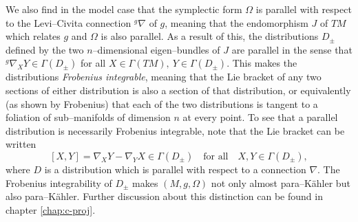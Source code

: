 We also find in the model case that the symplectic form $\Omega$ is parallel with respect to the Levi--Civita connection $^g\nabla$ of $g$, meaning that the endomorphism $J$ of $TM$ which relates $g$ and $\Omega$ is also parallel.  As a result of this, the distributions $D_\pm$ defined by the two $n$--dimensional eigen--bundles of $J$ are parallel in the sense that $^g\nabla_XY\in\Gamma(D_\pm)$ for all $X\in \Gamma(TM),\ Y\in\Gamma(D_\pm)$. This makes the distributions \textit{Frobenius integrable}, meaning that the Lie bracket of any two sections of either distribution is also a section of that distribution, or equivalently (as shown by Frobenius) that each of the two distributions is tangent to a foliation of sub--manifolds of dimension $n$ at every point. To see that a parallel distribution is necessarily Frobenius integrable, note that the Lie bracket can be written
\[
[X,Y]= \nabla_XY- \nabla_YX\in\Gamma(D_\pm)\quad\mbox{for all}\quad X,Y\in\Gamma(D_\pm),
\]
where $D$ is a distribution which is parallel with respect to a connection $\nabla$. The Frobenius integrability of $D_\pm$ makes $(M,g,\Omega)$ not only almost para--K\"ahler but also para--K\"ahler. Further discussion about this distinction can be found in chapter \ref{chap:c-proj}.





